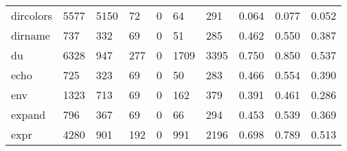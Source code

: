 \begin{longtable}{lp{1.3cm}p{1.3cm}p{1.3cm}p{1.3cm}p{1.3cm}p{1.3cm}p{1.3cm}p{1.3cm}p{1.3cm}}
dircolors &                   5577 &                               5150 &                                72 &                                0 &                                64 &                             291 &                                0.064 &                                  0.077 &                                0.052 \\
dirname   &                    737 &                                332 &                                69 &                                0 &                                51 &                             285 &                                0.462 &                                  0.550 &                                0.387 \\
du        &                   6328 &                                947 &                               277 &                                0 &                              1709 &                            3395 &                                0.750 &                                  0.850 &                                0.537 \\
echo      &                    725 &                                323 &                                69 &                                0 &                                50 &                             283 &                                0.466 &                                  0.554 &                                0.390 \\
env       &                   1323 &                                713 &                                69 &                                0 &                               162 &                             379 &                                0.391 &                                  0.461 &                                0.286 \\
expand    &                    796 &                                367 &                                69 &                                0 &                                66 &                             294 &                                0.453 &                                  0.539 &                                0.369 \\
expr      &                   4280 &                                901 &                               192 &                                0 &                               991 &                            2196 &                                0.698 &                                  0.789 &                                0.513 \\

\end{longtable}

